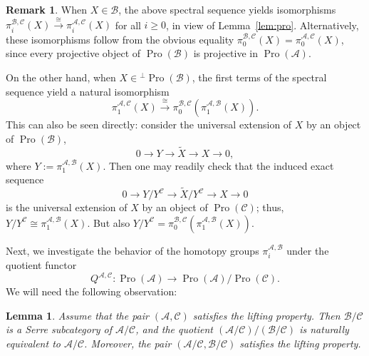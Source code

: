 \documentclass[11pt]{article}
\newtheorem{lemm}[theo]{Lemma}
\theoremstyle{definition}
\newtheorem{rema}[theo]{Remark}
\numberwithin{equation}{section}
\newcommand\cA{{\mathcal A}}
\newcommand\cB{{\mathcal B}}
\newcommand\cC{{\mathcal C}}
\newcommand\tX{{\widetilde X}}
\DeclareMathOperator{\Pro}{Pro}
\theoremstyle{remark}
\begin{document}
\begin{rema}\label{rem:comp}
When $X \in \cB$, the above spectral sequence yields isomorphisms $\pi_i^{\cB,\cC}(X) \stackrel{\cong}{\to} \pi_i^{\cA,\cC}(X)$ for all $i \geq 0$, in view of Lemma~\ref{lem:pro}. Alternatively, these isomorphisms follow from the obvious equality $\pi_0^{\cB,\cC}(X) = \pi_0^{\cA,\cC}(X)$, since every projective object of $\Pro(\cB)$ is projective in $\Pro(\cA)$.

On the other hand, when $X \in {^{\perp}\Pro(\cB)}$, the first terms of the spectral sequence yield a natural isomorphism
\[
\pi_1^{\cA,\cC}(X) \stackrel{\cong}{\longrightarrow}
\pi_0^{\cB,\cC}(\pi_1^{\cA,\cB}(X)).
\]
This can also be seen directly: consider the universal extension of $X$ by an object of $\Pro(\cB)$,
\[
0 \longrightarrow Y \longrightarrow \tX
\longrightarrow X \longrightarrow 0,
\]
where $Y := \pi_1^{\cA,\cB}(X)$. Then one may readily check that the induced exact sequence
\[
0 \longrightarrow Y/Y^{\cC}
\longrightarrow \tX/Y^{\cC} \longrightarrow X
\longrightarrow 0
\]
is the universal extension of $X$ by an object of $\Pro(\cC)$; thus, $Y/Y^{\cC} \cong \pi_1^{\cA,\cB}(X)$. But also $Y/Y^{\cC} = \pi_0^{\cB,\cC}(\pi_1^{\cA,\cB}(X))$.
\end{rema}

Next, we investigate the behavior of the homotopy groups $\pi_i^{\cA, \cB}$ under the quotient functor
\[
Q^{\cA,\cC} : \Pro(\cA) \longrightarrow \Pro(\cA)/\Pro(\cC).
\]
We will need the following observation:

\begin{lemm}\label{lem:standard}
Assume that the pair $(\cA,\cC)$ satisfies the lifting property. Then $\cB/\cC$ is a Serre subcategory of $\cA/\cC$, and the quotient $(\cA/\cC)/(\cB /\cC)$ is naturally equivalent to $\cA/\cC$. Moreover, the pair $(\cA/\cC,\cB/\cC)$ satisfies the lifting property.
\end{lemm}
\end{document}
